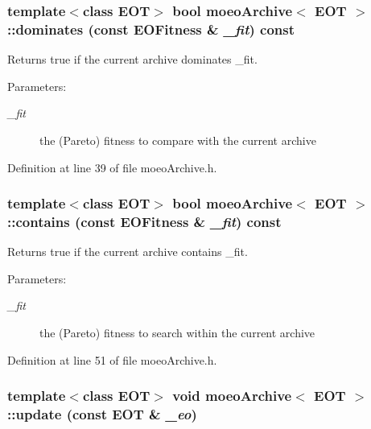 \subsubsection{\setlength{\rightskip}{0pt plus 5cm}template$<$class EOT$>$ bool {\bf moeo\-Archive}$<$ EOT $>$::dominates (const {\bf EOFitness} \& {\em \_\-fit}) const\hspace{0.3cm}{\tt  [inline]}}\label{classmoeoArchive_22b298bb0e4f4b02f9d8c5d3385134a2}


Returns true if the current archive dominates \_\-fit. 

\begin{Desc}
\item[Parameters:]
\begin{description}
\item[{\em \_\-fit}]the (Pareto) fitness to compare with the current archive \end{description}
\end{Desc}


Definition at line 39 of file moeo\-Archive.h.
\subsubsection{\setlength{\rightskip}{0pt plus 5cm}template$<$class EOT$>$ bool {\bf moeo\-Archive}$<$ EOT $>$::contains (const {\bf EOFitness} \& {\em \_\-fit}) const\hspace{0.3cm}{\tt  [inline]}}\label{classmoeoArchive_b62d5274da2b12802113858be49a21a4}


Returns true if the current archive contains \_\-fit. 

\begin{Desc}
\item[Parameters:]
\begin{description}
\item[{\em \_\-fit}]the (Pareto) fitness to search within the current archive \end{description}
\end{Desc}


Definition at line 51 of file moeo\-Archive.h.
\subsubsection{\setlength{\rightskip}{0pt plus 5cm}template$<$class EOT$>$ void {\bf moeo\-Archive}$<$ EOT $>$::update (const EOT \& {\em \_\-eo})\hspace{0.3cm}{\tt  [inline]}}\label{classmoeoArchive_be9f67bfe41c25537292056d5b30f56a}


